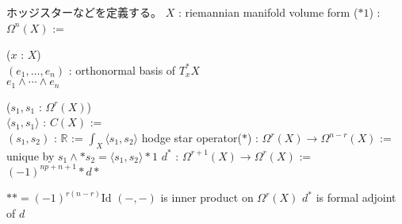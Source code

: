 \begin{Definition}
\itemnote
  ホッジスターなどを定義する。
\itemwhen \Fix \(X\) : riemannian manifold
\itemdefi
  \Define volume form (\(*1\)) : \(\Omega^n(X)\) :=
  \begin{indentblock}
    \For (\(x\) : \(X\)) \\
    \Take \((e_1 , \ldots , e_n)\) : orthonormal basis of \(T_x^* X\) \\
    \Return \(e_1 \wedge \cdots \wedge e_n\)
  \end{indentblock}
\itemdefi
  \For (\(s_1 , s_1\) : \(\Omega^r(X)\)) \\
  \Define \(\langle s_1 , s_1 \rangle\) : \(C(X)\) :=  \\
  \Define \((s_1 , s_2)\) : \(\mathbb{R}\) := \(\int_X \langle s_1 , s_2 \rangle\)
\itemdefi
  \Define hodge star operator(\(*\)) : \(\Omega^r(X) \to \Omega^{n-r}(X)\) := unique by \(s_1 \wedge * s_2 = \langle s_1 , s_2 \rangle *1\)
  \Define \(d^*\) : \(\Omega^{r+1}(X) \to \Omega^r(X)\) := \((-1)^{np + n + 1} * d *\)
\end{Definition}

\begin{Theorem}
\itemnote
  \(** = (-1)^{r(n-r)} \text{Id}\)
\itemnote
  \((- , -)\) is inner product on \(\Omega^r(X)\)
\itemnote
  \(d^*\) is formal adjoint of \(d\)
\end{Theorem}